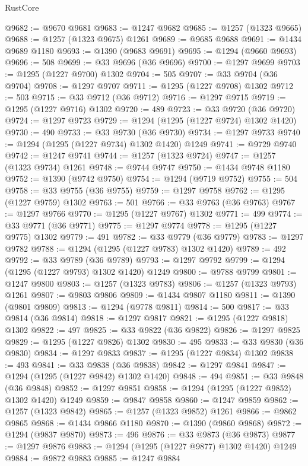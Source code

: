 \begin{lexlean}{RustCore}
\begin{coremodule}
@9682 := @9670 @9681
@9683 := @1247 @9682
@9685 := @1257 (@1323 @9665)
@9688 := @1257 (@1323 @9675) @1261
@9689 := @9685 @9688
@9691 := @1434 @9689 @1180
@9693 := @1390 (@9683 @9691)
@9695 := @1294 (@9660 @9693)
@9696 := 508
@9699 := @33 @9696 (@36 @9696)
@9700 := @1297 @9699
@9703 := @1295 (@1227 @9700) @1302
@9704 := 505
@9707 := @33 @9704 (@36 @9704)
@9708 := @1297 @9707
@9711 := @1295 (@1227 @9708) @1302
@9712 := 503
@9715 := @33 @9712 (@36 @9712)
@9716 := @1297 @9715
@9719 := @1295 (@1227 @9716) @1302
@9720 := 489
@9723 := @33 @9720 (@36 @9720)
@9724 := @1297 @9723
@9729 := @1294 (@1295 (@1227 @9724) @1302 @1420)
@9730 := 490
@9733 := @33 @9730 (@36 @9730)
@9734 := @1297 @9733
@9740 := @1294 (@1295 (@1227 @9734) @1302 @1420) @1249
@9741 := @9729 @9740
@9742 := @1247 @9741
@9744 := @1257 (@1323 @9724)
@9747 := @1257 (@1323 @9734) @1261
@9748 := @9744 @9747
@9750 := @1434 @9748 @1180
@9752 := @1390 (@9742 @9750)
@9754 := @1294 (@9719 @9752)
@9755 := 504
@9758 := @33 @9755 (@36 @9755)
@9759 := @1297 @9758
@9762 := @1295 (@1227 @9759) @1302
@9763 := 501
@9766 := @33 @9763 (@36 @9763)
@9767 := @1297 @9766
@9770 := @1295 (@1227 @9767) @1302
@9771 := 499
@9774 := @33 @9771 (@36 @9771)
@9775 := @1297 @9774
@9778 := @1295 (@1227 @9775) @1302
@9779 := 491
@9782 := @33 @9779 (@36 @9779)
@9783 := @1297 @9782
@9788 := @1294 (@1295 (@1227 @9783) @1302 @1420)
@9789 := 492
@9792 := @33 @9789 (@36 @9789)
@9793 := @1297 @9792
@9799 := @1294 (@1295 (@1227 @9793) @1302 @1420) @1249
@9800 := @9788 @9799
@9801 := @1247 @9800
@9803 := @1257 (@1323 @9783)
@9806 := @1257 (@1323 @9793) @1261
@9807 := @9803 @9806
@9809 := @1434 @9807 @1180
@9811 := @1390 (@9801 @9809)
@9813 := @1294 (@9778 @9811)
@9814 := 500
@9817 := @33 @9814 (@36 @9814)
@9818 := @1297 @9817
@9821 := @1295 (@1227 @9818) @1302
@9822 := 497
@9825 := @33 @9822 (@36 @9822)
@9826 := @1297 @9825
@9829 := @1295 (@1227 @9826) @1302
@9830 := 495
@9833 := @33 @9830 (@36 @9830)
@9834 := @1297 @9833
@9837 := @1295 (@1227 @9834) @1302
@9838 := 493
@9841 := @33 @9838 (@36 @9838)
@9842 := @1297 @9841
@9847 := @1294 (@1295 (@1227 @9842) @1302 @1420)
@9848 := 494
@9851 := @33 @9848 (@36 @9848)
@9852 := @1297 @9851
@9858 := @1294 (@1295 (@1227 @9852) @1302 @1420) @1249
@9859 := @9847 @9858
@9860 := @1247 @9859
@9862 := @1257 (@1323 @9842)
@9865 := @1257 (@1323 @9852) @1261
@9866 := @9862 @9865
@9868 := @1434 @9866 @1180
@9870 := @1390 (@9860 @9868)
@9872 := @1294 (@9837 @9870)
@9873 := 496
@9876 := @33 @9873 (@36 @9873)
@9877 := @1297 @9876
@9883 := @1294 (@1295 (@1227 @9877) @1302 @1420) @1249
@9884 := @9872 @9883
@9885 := @1247 @9884

\end{coremodule}
\end{lexlean}
